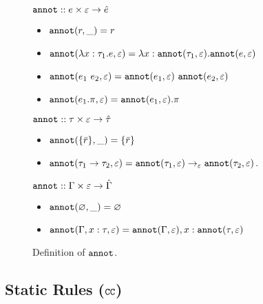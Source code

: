\begin{figure}
\vspace{-0.2cm}

$\mathtt{annot} :: e \times \varepsilon \rightarrow \hat e$
\vspace{-0.2cm}
\begin{itemize}
	\setlength\itemsep{-0.2em}
	\item[] $\mathtt{annot}(r, \_) = r$
	\item[] $\mathtt{annot}(\lambda x: \tau_1 . e, \varepsilon) = \lambda x: \mathtt{annot}(\tau_1, \varepsilon) . \mathtt{annot}(e, \varepsilon)$
	\item[] $\mathtt{annot}(e_1~e_2, \varepsilon) = \mathtt{annot}(e_1, \varepsilon)~\mathtt{annot}(e_2, \varepsilon)$
	\item[] $\mathtt{annot}(e_1.\pi, \varepsilon) = \mathtt{annot}(e_1, \varepsilon).\pi$
\end{itemize}
	
$\mathtt{annot} :: \tau \times \varepsilon \rightarrow \hat \tau$
\vspace{-0.2cm}

\begin{itemize}
	\setlength\itemsep{-0.2em}
	\item[] $\mathtt{annot}(\{ \bar r \}, \_) = \{ \bar r \}$
	\item[] $\mathtt{annot}(\tau_1 \rightarrow \tau_2, \varepsilon) = \mathtt{annot}(\tau_1, \varepsilon) \rightarrow_{\varepsilon} \mathtt{annot}(\tau_2, \varepsilon)$.	
\end{itemize}

$\mathtt{annot} :: \Gamma \times \varepsilon \rightarrow \hat \Gamma$
\vspace{-0.2cm}

\begin{itemize}
	\setlength\itemsep{-0.2em}
	\item[] $\mathtt{annot}(\varnothing, \_) = \varnothing$
	\item[] $\mathtt{annot}(\Gamma, x: \tau, \varepsilon) = \mathtt{annot}(\Gamma, \varepsilon), x: \mathtt{annot}(\tau, \varepsilon)$
\end{itemize}
\vspace{-0.5cm}
\caption{Definition of $\mathtt{annot}$.}
\vspace{-0.5cm}
\label{fig:annot_defn}
\end{figure}

\vspace{-0.5cm}

\subsection{Static Rules ($\mathtt{CC}$)}


